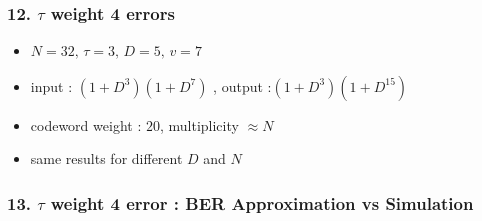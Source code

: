 \documentclass{beamer}  %
\begin{document}
\begin{frame}
\frametitle{12.  $\tau$ weight 4 errors}


\begin{example}
\begin{itemize}
\item  $N=32,\, \tau=3, \, D=5,\, v=7$

\item input : $(1+D^3)(1+D^7)$  , output :$(1+ D^3)(1+D^{15})$

\end{itemize}
\end{example}

\begin{itemize}
\setlength\itemsep{2em}
\item codeword weight : $20$, multiplicity $\approx N$

\item same results for different $D$ and $N$
\end{itemize}




\end{frame}

\begin{frame}
\frametitle{13.  $\tau$ weight 4 error : BER Approximation vs Simulation}



\end{frame}
\end{document}
